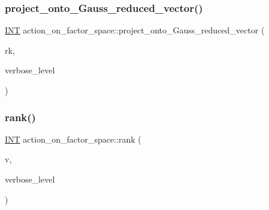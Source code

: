 \mbox{\label{classaction__on__factor__space_a5fb75ffaf4e5143735b9ff8938589691}} 
\subsubsection{\texorpdfstring{project\+\_\+onto\+\_\+\+Gauss\+\_\+reduced\+\_\+vector()}{project\_onto\_Gauss\_reduced\_vector()}}
{\footnotesize\ttfamily \mbox{\hyperlink{galois_8h_a09fddde158a3a20bd2dcadb609de11dc}{I\+NT}} action\+\_\+on\+\_\+factor\+\_\+space\+::project\+\_\+onto\+\_\+\+Gauss\+\_\+reduced\+\_\+vector (\begin{DoxyParamCaption}\item[{\mbox{\hyperlink{galois_8h_a09fddde158a3a20bd2dcadb609de11dc}{I\+NT}}}]{rk,  }\item[{\mbox{\hyperlink{galois_8h_a09fddde158a3a20bd2dcadb609de11dc}{I\+NT}}}]{verbose\+\_\+level }\end{DoxyParamCaption})}

\mbox{\label{classaction__on__factor__space_a05bddc91a8c098cefd14cdfe2fe0edad}} 
\subsubsection{\texorpdfstring{rank()}{rank()}}
{\footnotesize\ttfamily \mbox{\hyperlink{galois_8h_a09fddde158a3a20bd2dcadb609de11dc}{I\+NT}} action\+\_\+on\+\_\+factor\+\_\+space\+::rank (\begin{DoxyParamCaption}\item[{\mbox{\hyperlink{galois_8h_a09fddde158a3a20bd2dcadb609de11dc}{I\+NT}} $\ast$}]{v,  }\item[{\mbox{\hyperlink{galois_8h_a09fddde158a3a20bd2dcadb609de11dc}{I\+NT}}}]{verbose\+\_\+level }\end{DoxyParamCaption})}

